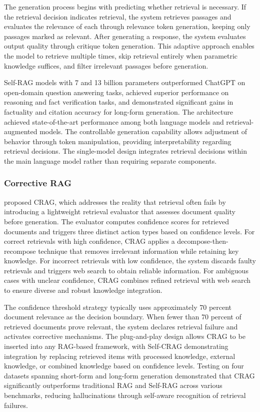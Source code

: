The generation process begins with predicting whether retrieval is necessary. If the retrieval decision indicates retrieval, the system retrieves passages and evaluates the relevance of each through relevance token generation, keeping only passages marked as relevant. After generating a response, the system evaluates output quality through critique token generation. This adaptive approach enables the model to retrieve multiple times, skip retrieval entirely when parametric knowledge suffices, and filter irrelevant passages before generation.

Self-RAG models with 7 and 13 billion parameters outperformed ChatGPT on open-domain question answering tasks, achieved superior performance on reasoning and fact verification tasks, and demonstrated significant gains in factuality and citation accuracy for long-form generation. The architecture achieved state-of-the-art performance among both language models and retrieval-augmented models. The controllable generation capability allows adjustment of behavior through token manipulation, providing interpretability regarding retrieval decisions. The single-model design integrates retrieval decisions within the main language model rather than requiring separate components.

\subsubsection{Corrective RAG}

\citet{yan2024corrective} proposed CRAG, which addresses the reality that retrieval often fails by introducing a lightweight retrieval evaluator that assesses document quality before generation. The evaluator computes confidence scores for retrieved documents and triggers three distinct action types based on confidence levels. For correct retrievals with high confidence, CRAG applies a decompose-then-recompose technique that removes irrelevant information while retaining key knowledge. For incorrect retrievals with low confidence, the system discards faulty retrievals and triggers web search to obtain reliable information. For ambiguous cases with unclear confidence, CRAG combines refined retrieval with web search to ensure diverse and robust knowledge integration.

The confidence threshold strategy typically uses approximately 70 percent document relevance as the decision boundary. When fewer than 70 percent of retrieved documents prove relevant, the system declares retrieval failure and activates corrective mechanisms. The plug-and-play design allows CRAG to be inserted into any RAG-based framework, with Self-CRAG demonstrating integration by replacing retrieved items with processed knowledge, external knowledge, or combined knowledge based on confidence levels. Testing on four datasets spanning short-form and long-form generation demonstrated that CRAG significantly outperforms traditional RAG and Self-RAG across various benchmarks, reducing hallucinations through self-aware recognition of retrieval failures.

